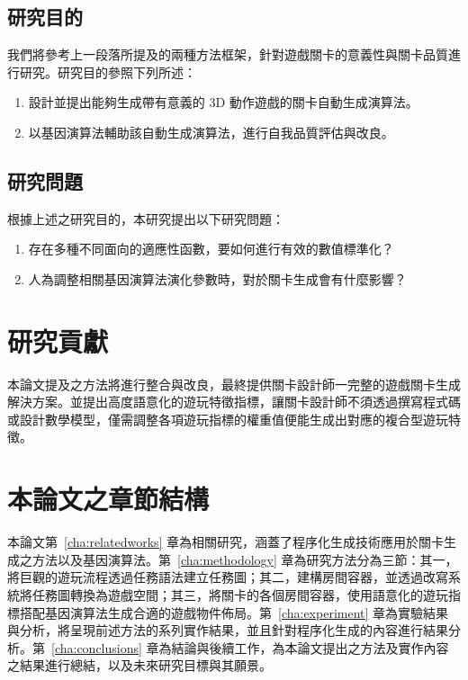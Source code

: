 \subsection{研究目的}

我們將參考上一段落所提及的兩種方法框架，針對遊戲關卡的意義性與關卡品質進行研究。研究目的參照下列所述：

\begin{enumerate}
  \setlength\itemsep{-0.5em}
  \item 設計並提出能夠生成帶有意義的 3D 動作遊戲的關卡自動生成演算法。
  \item 以基因演算法輔助該自動生成演算法，進行自我品質評估與改良。
\end{enumerate}

\subsection{研究問題}

根據上述之研究目的，本研究提出以下研究問題：

\begin{enumerate}
  \setlength\itemsep{-0.5em}
  \item 存在多種不同面向的適應性函數，要如何進行有效的數值標準化？
  \item 人為調整相關基因演算法演化參數時，對於關卡生成會有什麼影響？
\end{enumerate}

\section{研究貢獻}

本論文提及之方法將進行整合與改良，最終提供關卡設計師一完整的遊戲關卡生成解決方案。並提出高度語意化的遊玩特徵指標，讓關卡設計師不須透過撰寫程式碼或設計數學模型，僅需調整各項遊玩指標的權重值便能生成出對應的複合型遊玩特徵。

\section{本論文之章節結構}

本論文第~\ref{cha:relatedworks} 章為相關研究，涵蓋了程序化生成技術應用於關卡生成之方法以及基因演算法。第~\ref{cha:methodology} 章為研究方法分為三節：其一，將巨觀的遊玩流程透過任務語法建立任務圖；其二，建構房間容器，並透過改寫系統將任務圖轉換為遊戲空間；其三，將關卡的各個房間容器，使用語意化的遊玩指標搭配基因演算法生成合適的遊戲物件佈局。第~\ref{cha:experiment} 章為實驗結果與分析，將呈現前述方法的系列實作結果，並且針對程序化生成的內容進行結果分析。第~\ref{cha:conclusions} 章為結論與後續工作，為本論文提出之方法及實作內容之結果進行總結，以及未來研究目標與其願景。